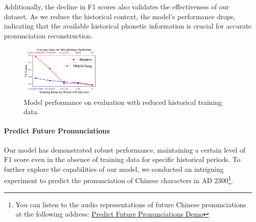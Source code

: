 Additionally, the decline in F1 scores also validates the effectiveness of our dataset. As we reduce the historical context, the model's performance drops, indicating that the available historical phonetic information is crucial for accurate pronunciation reconstruction.

\begin{figure}[ht]
    \centering
    \includegraphics[width=0.35\textwidth]{images/history_reduced.png}
    \caption{Model performance on evaluation with reduced historical training data.}
    \label{fig:reduce history context}
\end{figure}

\paragraph{Predict Future Pronunciations}
Our model has demonstrated robust performance, maintaining a certain level of F1 score even in the absence of training data for specific historical periods. To further explore the capabilities of our model, we conducted an intriguing experiment to predict the pronunciation of Chinese characters in AD 2300\footnote{You can listen to the audio representations of future Chinese pronunciations at the following address: \href{http://47.97.123.246:8080/}{Predict Future Pronunciations Demo}}.
